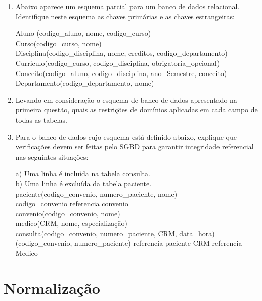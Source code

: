 \documentclass[11pt]{article}
\begin{document}
	\begin{enumerate}
		\item Abaixo aparece um esquema parcial para um banco de dados relacional. Identifique neste
		esquema as chaves primárias e as chaves estrangeiras: 
		
		Aluno (codigo\_aluno, nome, codigo\_curso)\\
		Curso(codigo\_curso, nome)\\
		Disciplina(codigo\_disciplina, nome, creditos, codigo\_departamento)\\
		Curriculo(codigo\_curso, codigo\_disciplina, obrigatoria\_opcional)\\
		Conceito(codigo\_aluno, codigo\_disciplina, ano\_Semestre, conceito)\\
		Departamento(codigo\_departamento, nome)
		
		\item Levando em consideração o esquema de banco de dados apresentado na primeira questão, quais
		as restrições de domínios aplicadas em cada campo de todas as tabelas.
		
		\item Para o banco de dados cujo esquema está definido abaixo, explique que verificações devem ser
		feitas pelo SGBD para garantir integridade referencial nas seguintes situações: 
		
		a) Uma linha é incluída na tabela consulta.\\
		b) Uma linha é excluída da tabela paciente.\\
		
		paciente(codigo\_convenio, numero\_paciente, nome)\\
		codigo\_convenio referencia convenio\\
		convenio(codigo\_convenio, nome)\\
		medico(CRM, nome, especialização)\\
		consulta(codigo\_convenio, numero\_paciente, CRM, data\_hora)\\
		(codigo\_convenio, numero\_paciente) referencia paciente CRM referencia Medico 
	\end{enumerate}
	
	\newpage
	
	\section{Normalização}
	
\end{document}
